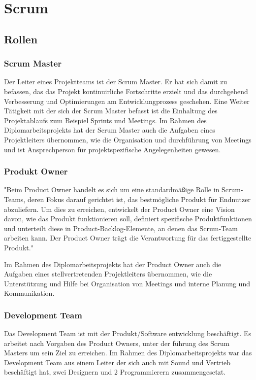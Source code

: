 
\section{Scrum}\label{sec:scrum}

\renewcommand{\kapitelautor}{Autor: Irgendwer} %

\subsection{Rollen}\label{subsec:rollen}

%
\subsubsection{Scrum Master}\label{subsubsec:Scrum-Master}
%
Der Leiter eines Projektteams ist der Scrum Master. Er hat sich damit zu befassen, das das Projekt kontinuirliche Fortschritte erzielt und das durchgehend Verbesserung und Optimierungen am Entwicklungprozess geschehen.
Eine Weiter Tätigkeit mit der sich der Scrum Master befasst ist die Einhaltung des Projektablaufs zum Beispiel Sprints und Meetings.\cite{AsanaScrumMaster}
Im Rahmen des Diplomarbeitsprojekts hat der Scrum Master auch die Aufgaben eines Projektleiters übernommen, wie die Organisation und durchführung von Meetings und ist Ansprechperson für projektspezifische Angelegenheiten gewesen.
%
\subsubsection{Produkt Owner}\label{subsubsec:Product-Owner}
%
"Beim Product Owner handelt es sich um eine standardmäßige Rolle in Scrum-Teams, deren Fokus darauf gerichtet ist, das bestmögliche Produkt für Endnutzer abzuliefern.
Um dies zu erreichen, entwickelt der Product Owner eine Vision davon, wie das Produkt funktionieren soll, definiert spezifische Produktfunktionen und unterteilt diese in Product-Backlog-Elemente, an denen das Scrum-Team arbeiten kann. 
Der Product Owner trägt die Verantwortung für das fertiggestellte Produkt."\cite{AsanaProductOwner}

Im Rahmen des Diplomarbeitsprojekts hat der Product Owner auch die Aufgaben eines stellvertretenden Projektleiters übernommen, wie die Unterstützung und Hilfe bei Organisation von Meetings und interne Planung und Kommunikation.
%
\subsubsection{Development Team}\label{subsubsec:Development-Team}
%
Das Development Team ist mit der Produkt/Software entwicklung beschäftigt. Es arbeitet nach Vorgaben des Product Owners, unter der führung des Scrum Masters um sein Ziel zu erreichen.
Im Rahmen des Diplomarbeitsprojekts war das Development Team aus einem Leiter der sich auch mit Sound und Vertrieb beschäftigt hat, zwei Designern und 2 Programmierern zusammengesetzt.
%
